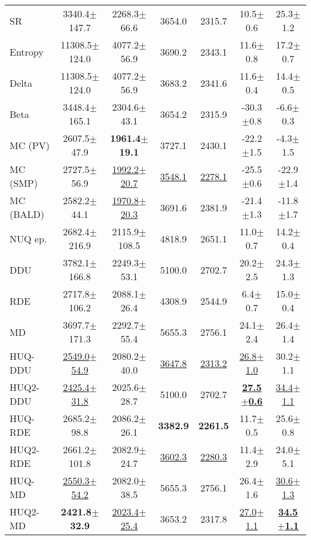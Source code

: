 \begin{table*}[!ht]
{\begin{tabular}{l|c|c|c|c|c|c}
SR & 3340.4$\pm$147.7 & 2268.3$\pm$66.6 & 3654.0 & 2315.7 & 10.5$\pm$0.6 & 25.3$\pm$1.2 \\
Entropy & 11308.5$\pm$124.0 & 4077.2$\pm$56.9 & 3690.2 & 2343.1 & 11.6$\pm$0.8 & 17.2$\pm$0.7 \\
Delta & 11308.5$\pm$124.0 & 4077.2$\pm$56.9 & 3683.2 & 2341.6 & 11.6$\pm$0.4 & 14.4$\pm$0.5 \\
Beta & 3448.4$\pm$165.1 & 2304.6$\pm$43.1 & 3654.2 & 2315.9 & -30.3$\pm$0.8 & -6.6$\pm$0.3 \\\midrule
MC (PV) & 2607.5$\pm$47.9 & \textbf{1961.4$\pm$19.1} & 3727.1 & 2430.1 & -22.2$\pm$1.5 & -4.3$\pm$1.5 \\
MC (SMP) & 2727.5$\pm$56.9 & \underline{1992.2$\pm$20.7} & \underline{3548.1} & \underline{2278.1} & -25.5$\pm$0.6 & -22.9$\pm$1.4 \\
MC (BALD) & 2582.2$\pm$44.1 & \underline{1970.8$\pm$20.3} & 3691.6 & 2381.9 & -21.4$\pm$1.3 & -11.8$\pm$1.7 \\\midrule
NUQ ep. & 2682.4$\pm$216.9 & 2115.9$\pm$108.5 & 4818.9 & 2651.1 & 11.0$\pm$0.7 & 14.2$\pm$0.4 \\
DDU & 3782.1$\pm$166.8 & 2249.3$\pm$53.1 & 5100.0 & 2702.7 & 20.2$\pm$2.5 & 24.3$\pm$1.3 \\
RDE & 2717.8$\pm$106.2 & 2088.1$\pm$26.4 & 4308.9 & 2544.9 & 6.4$\pm$0.7 & 15.0$\pm$0.4 \\
MD & 3697.7$\pm$171.3 & 2292.7$\pm$55.4 & 5655.3 & 2756.1 & 24.1$\pm$2.4 & 26.4$\pm$1.4 \\\midrule
HUQ-DDU & \underline{2549.0$\pm$54.9} & 2080.2$\pm$40.0 & \underline{3647.8} & \underline{2313.2} & \underline{26.8$\pm$1.0} & 30.2$\pm$1.1 \\
HUQ2-DDU & \underline{2425.4$\pm$31.8} & 2025.6$\pm$28.7 & 5100.0 & 2702.7 & \underline{\textbf{27.5$\pm$0.6}} & \underline{34.4$\pm$1.1} \\
HUQ-RDE & 2685.2$\pm$98.8 & 2086.2$\pm$26.1 & \textbf{3382.9} & \textbf{2261.5} & 11.7$\pm$0.5 & 25.6$\pm$0.8 \\
HUQ2-RDE & 2661.2$\pm$101.8 & 2082.9$\pm$24.7 & \underline{3602.3} & \underline{2280.3} & 11.4$\pm$2.9 & 24.0$\pm$5.1 \\
HUQ-MD & \underline{2550.3$\pm$54.2} & 2082.0$\pm$38.5 & 5655.3 & 2756.1 & 26.4$\pm$1.6 & \underline{30.6$\pm$1.3} \\
HUQ2-MD & \textbf{2421.8$\pm$32.9} & \underline{2023.4$\pm$25.4} & 3653.2 & 2317.8 & \underline{27.0$\pm$1.1} & \underline{\textbf{34.5$\pm$1.1}} \\

\end{tabular}}
\end{table*}
